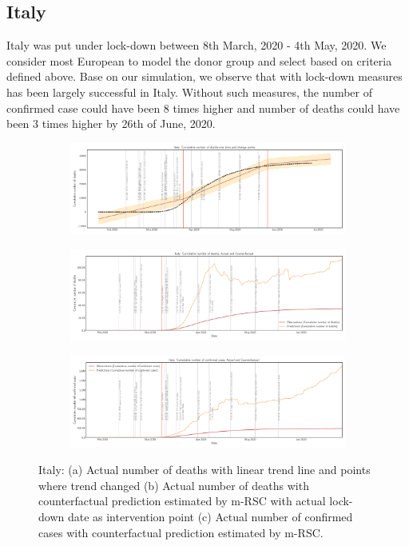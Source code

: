 \documentclass[preprint,authoryear,12pt]{elsarticle}
\begin{document}
	
	\subsection{Italy}
	 Italy was put under lock-down between 8th March, 2020 - 4th May, 2020. We consider most European to model the donor group and select based on criteria defined above. Base on our simulation, we observe that with lock-down measures  has been largely successful in Italy. Without such measures, the number of confirmed case could have been 8 times higher and number of deaths could have been 3 times higher by 26th of June, 2020.
	 
		\begin{figure}
		\centering
		\begin{subfigure}[b]{\textwidth}
			\centering
			\includegraphics[width=0.9\linewidth,height=0.2\textheight]{Italy_deaths_trend}
		\end{subfigure}
		
		\begin{subfigure}[b]{\textwidth}
			\centering
			\includegraphics[width=0.9\linewidth,height=0.2\textheight]{Italy_deaths}
		\end{subfigure}
		
		\begin{subfigure}[b]{\textwidth}
			\centering
			\includegraphics[width=0.9\linewidth,height=0.2\textheight]{Italy_confirmed cases}
		\end{subfigure}
		
		\caption[Italy]{Italy: (a) Actual number of deaths with linear trend line and points where trend changed (b) Actual number of deaths with counterfactual prediction estimated by m-RSC with actual lock-down date as intervention point (c) Actual number of confirmed cases with counterfactual prediction estimated by m-RSC.}
		\label{fig6} 
	\end{figure}
\end{document}
